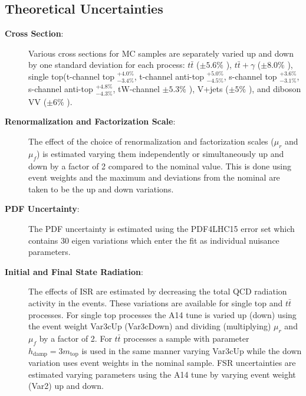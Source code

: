 \subsection{Theoretical Uncertainties}
\begin{description}
\item[\textbf{Cross Section}:]  Various cross sections for MC samples are separately varied up and down by one standard deviation for each process: $t\bar{t}$ ($\pm5.6\%$ \cite{ttXSec}), $t\bar{t}+\gamma$ ($\pm 8.0\%$ \cite{ATLAS:2018pmj}), single top(t-channel top $^{+4.0\%}_{-3.4\%}$, t-channel anti-top $^{+5.0\%}_{-4.5\%}$, s-channel top $^{+3.6\%}_{-3.1\%}$, s-channel anti-top $^{+4.8\%}_{-4.3\%}$, tW-channel $\pm 5.3\%$ \cite{SingleTopXSec}), V+jets ($\pm5\%$ \cite{VXSec}), and diboson VV ($\pm 6\%$ \cite{VXSec}).  

\item[\textbf{Renormalization and Factorization Scale}:]  The effect of the choice of renormalization and factorization scales ($\mu_r$ and $\mu_f$) is estimated varying them independently or simultaneously up and down by a factor of 2 compared to the nominal value.  This is done using event weights and the maximum and deviations from the nominal are taken to be the up and down variations.

\item[\textbf{PDF Uncertainty}:]  The PDF uncertainty is estimated using the PDF4LHC15 error set which contains 30 eigen variations which enter the fit as individual nuisance parameters.

\item[\textbf{Initial and Final State Radiation}:] The effects of ISR are estimated by decreasing the total QCD radiation activity in the events.  These variations are available for single top and $t\bar{t}$ processes.  For single top processes the A14 tune is varied up (down) using the event weight Var3cUp (Var3cDown) and dividing (multiplying) $\mu_r$ and $\mu_f$ by a factor of 2.  For $t\bar{t}$ processes a sample with parameter $h_\text{damp}=3m_\text{top}$ is used in the same manner varying Var3cUp while the down variation uses event weights in the nominal sample.   FSR uncertainties are estimated varying parameters using the A14 tune by varying event weight (Var2) up and down. %


\end{description}
